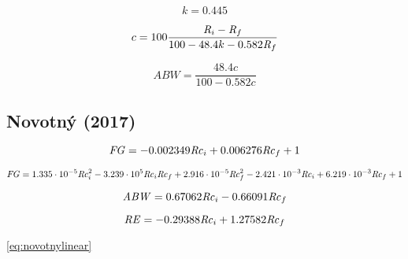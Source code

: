\documentclass[a4paper,parskip=half]{scrartcl}
\begin{document}
\begin{equation}
k = 0.445
\end{equation}

\begin{equation}
c = 100 \frac{\mathit{R}_i - \mathit{R}_f}{100 - 48.4 k - 0.582 \mathit{R}_f}
\end{equation}

\begin{equation}
\mathit{ABW} = \frac{48.4c}{100 - 0.582 c}
\label{eq:gossett} 
\end{equation}

\subsection*{Novotný (2017)}

\begin{equation} 
\mathit{FG}=-0.002349 \mathit{Rc}_i + 0.006276 \mathit{Rc}_f + 1
\label{eq:novotnylinear} 
\end{equation}

\begin{equation} 
\mathit{FG}=1.335 \cdot 10^{-5} \mathit{Rc}_i^2 - 3.239 \cdot 10^{5} \mathit{Rc}_i \mathit{Rc}_f +
2.916 \cdot 10^{-5} \mathit{Rc}_f^2 - 2.421 \cdot 10^{-3} \mathit{Rc}_i +
6.219 \cdot 10^{-3} \mathit{Rc}_f + 1
\label{eq:novotnyquadratic} 
\end{equation}

\begin{equation} 
\mathit{ABW} = 0.67062 \mathit{Rc}_i - 0.66091 \mathit{Rc}_f
\end{equation}

\begin{equation} 
\mathit{RE} = -0.29388 \mathit{Rc}_i + 1.27582 \mathit{Rc}_f
\end{equation} 





\autoref{eq:novotnylinear}




\printbibliography[title=Quellen]
\end{document}
